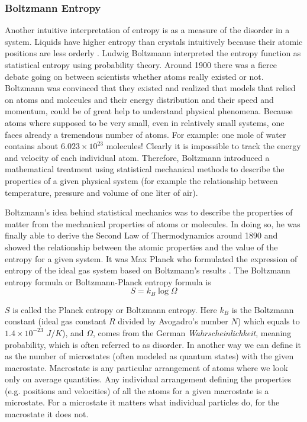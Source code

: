 	
		\subsubsection{Boltzmann Entropy}
		Another intuitive interpretation of entropy is as a measure of the disorder in a system.  Liquids have higher entropy	than crystals intuitively because their atomic positions are less orderly \cite{Sethna2006}. Ludwig Boltzmann	interpreted the entropy function as statistical entropy using probability theory.	Around 1900 there was a fierce debate going on between scientists whether atoms really existed	or not. Boltzmann was convinced that they existed and realized that models that relied on atoms	and molecules and their energy distribution and their speed and momentum, could be of great	help to understand physical phenomena. Because atoms where supposed to be very small, even	in relatively small systems, one faces already a tremendous number of atoms. For example: one
		mole of water contains about $6.023 \times 10^{23}$ molecules! Clearly it is impossible to track the energy	and velocity of each individual atom. Therefore, Boltzmann introduced a mathematical treatment	using statistical mechanical methods to describe the properties of a given physical system (for example the relationship between temperature, pressure and volume of one liter of air). 
		
		Boltzmann's	idea behind statistical mechanics was to describe the properties of matter from the mechanical	properties of atoms or molecules. In doing so, he was finally able to derive the Second Law of	Thermodynamics around 1890 and showed the relationship between the atomic properties and the	value of the entropy for a given system. It was Max Planck who formulated the expression of entropy of the ideal gas system based on Boltzmann’s results \cite{Schmitz2007}. The Boltzmann entropy formula	or Boltzmann-Planck entropy formula is
		\begin{equation}
			S = k_B \log\Omega
			\label{eqn:boltzmann-entropy}
		\end{equation}
	
		$S$ is called the Planck entropy or Boltzmann entropy. Here $k_B$ is the Boltzmann constant
		(ideal gas constant $R$ divided by Avogadro's number $N$) which equals to $1.4 \times 10^{-23}$ $J/K$), and $\Omega$, comes from the German \textit{Wahrscheinlichkeit}, meaning probability, which is often referred to as	disorder. In another way we can define it as the number of microstates (often modeled as quantum	states) with the given macrostate. Macrostate is any particular arrangement of atoms where we	look only on average quantities. Any individual arrangement defining the properties (e.g. positions	and velocities) of all the atoms for a given macrostate is a microstate. For a microstate it matters	what individual particles do, for the macrostate it does not.
		
